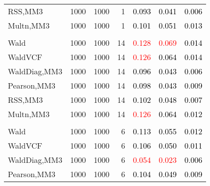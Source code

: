 \documentclass[
]{article}
\begin{document}
\begin{table}[H]
{\begin{tabular}[t]{lrrrrrr}
\hspace{1em}RSS,MM3 & 1000 & 1000 & 1 & \textcolor{black}{0.093} & \textcolor{black}{0.041} & \textcolor{black}{0.006}\\
\hspace{1em}Multn,MM3 & 1000 & 1000 & 1 & \textcolor{black}{0.101} & \textcolor{black}{0.051} & \textcolor{black}{0.013}\\
\addlinespace[0.3em]
\multicolumn{7}{l}{\textbf{1F 15V}}\\
\hspace{1em}Wald & 1000 & 1000 & 14 & \textcolor{red}{0.128} & \textcolor{red}{0.069} & \textcolor{black}{0.014}\\
\hspace{1em}WaldVCF & 1000 & 1000 & 14 & \textcolor{red}{0.126} & \textcolor{black}{0.064} & \textcolor{black}{0.014}\\
\hspace{1em}WaldDiag,MM3 & 1000 & 1000 & 14 & \textcolor{black}{0.096} & \textcolor{black}{0.043} & \textcolor{black}{0.006}\\
\hspace{1em}Pearson,MM3 & 1000 & 1000 & 14 & \textcolor{black}{0.098} & \textcolor{black}{0.043} & \textcolor{black}{0.009}\\
\hspace{1em}RSS,MM3 & 1000 & 1000 & 14 & \textcolor{black}{0.102} & \textcolor{black}{0.048} & \textcolor{black}{0.007}\\
\hspace{1em}Multn,MM3 & 1000 & 1000 & 14 & \textcolor{red}{0.126} & \textcolor{black}{0.064} & \textcolor{black}{0.012}\\
\addlinespace[0.3em]
\multicolumn{7}{l}{\textbf{2F 10V}}\\
\hspace{1em}Wald & 1000 & 1000 & 6 & \textcolor{black}{0.113} & \textcolor{black}{0.055} & \textcolor{black}{0.012}\\
\hspace{1em}WaldVCF & 1000 & 1000 & 6 & \textcolor{black}{0.106} & \textcolor{black}{0.050} & \textcolor{black}{0.011}\\
\hspace{1em}WaldDiag,MM3 & 1000 & 1000 & 6 & \textcolor{red}{0.054} & \textcolor{red}{0.023} & \textcolor{black}{0.006}\\
\hspace{1em}Pearson,MM3 & 1000 & 1000 & 6 & \textcolor{black}{0.104} & \textcolor{black}{0.049} & \textcolor{black}{0.009}\\

\end{tabular}}
\end{table}
\end{document}
